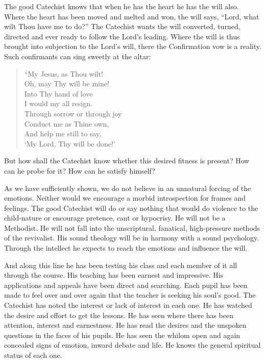  The good Catechist knows that when he has the heart he has the will also. Where the heart has been moved and melted and won, the will says, “Lord, what wilt Thou have me to do?” The Catechist wants the will converted, turned, directed and ever ready to follow the Lord’s leading. Where the will is thus brought into subjection to the Lord’s will, there the Confirmation vow is a reality. Such confirmants can sing sweetly at the altar:
\begin{verse}
“My Jesus, as Thou wilt!\\
Oh, may Thy will be mine!\\
Into Thy hand of love\\
I would my all resign.\\
Through sorrow or through joy\\
Conduct me as Thine own,\\
And help me still to say,\\
‘My Lord, Thy will be done!’
\end{verse}

But how shall the Catechist know whether this desired fitness is present? How can he probe for it? How can he satisfy himself?

 As we have sufficiently shown, we do not believe in an unnatural forcing of the emotions. Neither would we encourage a morbid introspection for frames and feelings. The good Catechist will do or say nothing that would do violence to the child-nature or encourage pretence, cant or hypocrisy. He will not be a Methodist. He will not fall into the unscriptural, fanatical, high-pressure methods of the revivalist. His sound theology will be in harmony with a sound psychology. Through the intellect he expects to reach the emotions and influence the will.

 And along this line he has been testing his class and each member of it all through the course. His teaching has been earnest and impressive. His applications and appeals have been direct and searching. Each pupil has been made to feel over and over again that the teacher is seeking his soul's good. The Catechist has noted the interest or lack of interest in each one. He has watched the desire and effort to get the lessons. He has seen where there has been attention, interest and earnestness. He has read the desires and the unspoken questions in the faces of his pupils. He has seen the whilom open and again concealed signs of emotion, inward
debate and life. He knows the general spiritual status of each one.


